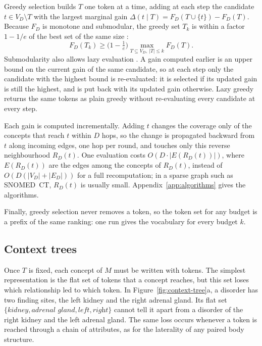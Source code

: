 Greedy selection builds $T$ one token at a time, adding at each step the candidate $t \in V_D \setminus T$ with the largest marginal gain $\Delta(t \mid T) = F_D(T \cup \{t\}) - F_D(T)$.
Because $F_D$ is monotone and submodular, the greedy set $T_k$ is within a factor $1 - 1/e$ of the best set of the same size \cite{nemhauser1978analysis}:
\begin{equation}
F_D(T_k) \ge \Big(1 - \tfrac{1}{e}\Big) \max_{T \subseteq V_D,\ |T| \le k} F_D(T).
\label{eq:guarantee}
\end{equation}
Submodularity also allows lazy evaluation \cite{minoux1978accelerated}.
A gain computed earlier is an upper bound on the current gain of the same candidate, so at each step only the candidate with the highest bound is re-evaluated: it is selected if its updated gain is still the highest, and is put back with its updated gain otherwise.
Lazy greedy returns the same tokens as plain greedy without re-evaluating every candidate at every step.

Each gain is computed incrementally.
Adding $t$ changes the coverage only of the concepts that reach $t$ within $D$ hops, so the change is propagated backward from $t$ along incoming edges, one hop per round, and touches only this reverse neighbourhood $R_D(t)$.
One evaluation costs $O(D \cdot |E(R_D(t))|)$, where $E(R_D(t))$ are the edges among the concepts of $R_D(t)$, instead of $O(D(|V_D| + |E_D|))$ for a full recomputation; in a sparse graph such as SNOMED~CT, $R_D(t)$ is usually small.
Appendix~\ref{app:algorithms} gives the algorithms.

Finally, greedy selection never removes a token, so the token set for any budget is a prefix of the same ranking: one run gives the vocabulary for every budget $k$.

\subsection{Context trees}
\label{sec:method:tokenizer}

Once $T$ is fixed, each concept of $M$ must be written with tokens.
The simplest representation is the flat set of tokens that a concept reaches, but this set loses which relationship led to which token.
In Figure~\ref{fig:context-tree}a, a disorder has two finding sites, the left kidney and the right adrenal gland.
Its flat set $\{\textit{kidney}, \textit{adrenal gland}, \textit{left}, \textit{right}\}$ cannot tell it apart from a disorder of the right kidney and the left adrenal gland.
The same loss occurs whenever a token is reached through a chain of attributes, as for the laterality of any paired body structure.

